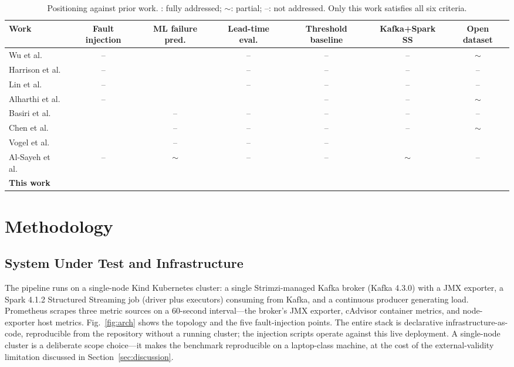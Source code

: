 \documentclass[conference]{IEEEtran}
\newcommand{\yes}{\checkmark}
\newcommand{\no}{--}
\newcommand{\pmark}{$\sim$}
\begin{document}
\begin{table}[!t]
\caption{Positioning against prior work. \yes: fully addressed; \pmark: partial; \no: not addressed. Only this work satisfies all six criteria.}
\label{tab:related}
\centering
\footnotesize
\begin{tabular}{@{}lcccccc@{}}
\toprule
\textbf{Work} & \textbf{Fault injection} & \textbf{ML failure pred.} & \textbf{Lead-time eval.} & \textbf{Threshold baseline} & \textbf{Kafka+Spark SS} & \textbf{Open dataset} \\
\midrule
Wu et al.\ \cite{wu2021}          & \no  & \yes & \no  & \no & \no  & \pmark \\
Harrison et al.\ \cite{harrison2018} & \no  & \yes & \no  & \no & \no  & \no \\
Lin et al.\ \cite{lin2018}        & \no  & \yes & \no  & \no & \no  & \no \\
Alharthi et al.\ \cite{alharthi2023} & \no  & \yes & \yes & \no & \no  & \pmark \\
Basiri et al.\ \cite{basiri2016}  & \yes & \no  & \no  & \no & \no  & \no \\
Chen et al.\ \cite{chen2025}      & \yes & \no  & \no  & \no & \no  & \pmark \\
Vogel et al.\ \cite{vogel2024}    & \yes & \no  & \no  & \no & \yes & \yes \\
Al-Sayeh et al.\ \cite{alsayeh2020} & \no & \pmark & \no & \no & \pmark & \no \\
\textbf{This work}                & \yes & \yes & \yes & \yes & \yes & \yes \\
\bottomrule
\end{tabular}
\end{table}

\section{Methodology}\label{sec:method}
\subsection{System Under Test and Infrastructure}
The pipeline runs on a single-node Kind Kubernetes cluster: a single Strimzi-managed Kafka broker (Kafka 4.3.0) with a JMX exporter, a Spark 4.1.2 Structured Streaming job (driver plus executors) consuming from Kafka, and a continuous producer generating load. Prometheus scrapes three metric sources on a 60-second interval---the broker's JMX exporter, cAdvisor container metrics, and node-exporter host metrics. Fig.~\ref{fig:arch} shows the topology and the five fault-injection points. The entire stack is declarative infrastructure-as-code, reproducible from the repository without a running cluster; the injection scripts operate against this live deployment. A single-node cluster is a deliberate scope choice---it makes the benchmark reproducible on a laptop-class machine, at the cost of the external-validity limitation discussed in Section~\ref{sec:discussion}.
\end{document}
